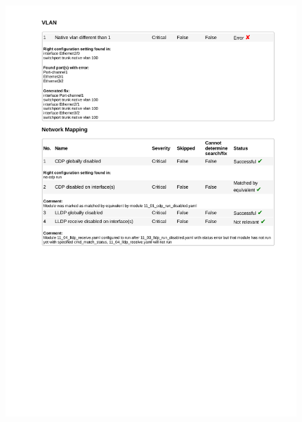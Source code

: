 \begin{figure}[H]
	\begin{center}
		\vspace{-0.8cm}\includegraphics[scale=0.9]{obrazky/report_html_page_2.pdf}
	\end{center}
	
	\label{report_2}
\end{figure}






